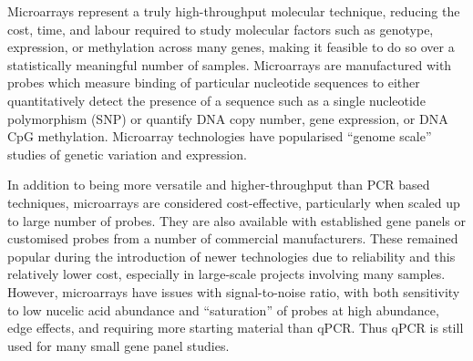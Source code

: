 Microarrays represent a truly high-throughput molecular technique, reducing the cost, time, and labour required to study molecular factors such as genotype, expression, or methylation across many genes, making it feasible to do so over a statistically meaningful number of samples. Microarrays are manufactured with probes which measure binding of particular nucleotide sequences to either quantitatively detect the presence of a sequence such as a single nucleotide polymorphism (SNP) or quantify DNA copy number, gene expression, or DNA CpG methylation. Microarray technologies have popularised ``genome scale'' studies of genetic variation and expression.

In addition to being more versatile and higher-throughput than PCR based techniques, microarrays are considered cost-effective, particularly when scaled up to large number of probes. They are also available with established gene panels or customised probes from a number of commercial manufacturers. These remained popular during the introduction of newer technologies due to reliability and this relatively lower cost, especially in large-scale projects involving many samples. However, microarrays have issues with signal-to-noise ratio, with both sensitivity to low nucelic acid abundance and ``saturation'' of probes at high abundance, edge effects, and requiring more starting material than qPCR. Thus qPCR is still used for many small gene panel studies.


